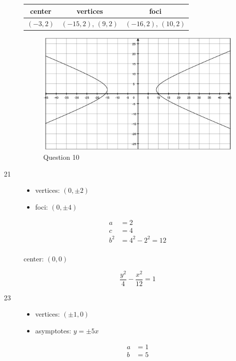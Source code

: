 \documentclass[fleqn,addpoints]{exam}
\begin{document}
\begin{description}
\begin{tabular}{ccc}
\toprule
center & vertices & foci \\
\midrule
  $(-3, 2)$ & $(-15, 2)$, $(9, 2)$ & $(-16, 2)$, $(10, 2)$ \\
\bottomrule
\end{tabular}

\begin{figure}[H]
  \centering
  \includegraphics[scale=.3]{p802_10.eps}
  \caption*{Question 10}
\end{figure}

\item[21]
\begin{itemize}
  \item vertices: $(0, \pm 2)$
  \item foci: $(0, \pm 4)$
\end{itemize}

\begin{align*}
  a &= 2 \\
  c &= 4 \\
  b^2 &= 4^2 - 2^2 = 12 \\
\end{align*}

center: $(0, 0)$

\[
  \frac{y^2}{4} - \frac{x^2}{12} = 1 
\]

\item[23]
\begin{itemize}
  \item vertices: $(\pm 1, 0)$
  \item asymptotes: $y = \pm 5x$
\end{itemize}

\begin{align*}
  a &= 1 \\
  b &= 5 \\
\end{align*}


\end{description}
\end{document}
